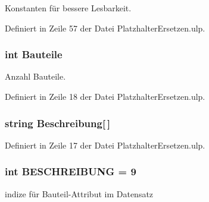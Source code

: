 Konstanten für bessere Lesbarkeit. 



Definiert in Zeile 57 der Datei Platzhalter\+Ersetzen.\+ulp.

\hypertarget{_platzhalter_ersetzen_8ulp_a82a1393e9fe80f33f56eeeb9b8d2195c}{}
\subsubsection[{Bauteile}]{\setlength{\rightskip}{0pt plus 5cm}int Bauteile}\label{_platzhalter_ersetzen_8ulp_a82a1393e9fe80f33f56eeeb9b8d2195c}


Anzahl Bauteile. 



Definiert in Zeile 18 der Datei Platzhalter\+Ersetzen.\+ulp.

\hypertarget{_platzhalter_ersetzen_8ulp_a0165df64e95135bade509c58bdb353f1}{}
\subsubsection[{Beschreibung}]{\setlength{\rightskip}{0pt plus 5cm}string Beschreibung\mbox{[}$\,$\mbox{]}}\label{_platzhalter_ersetzen_8ulp_a0165df64e95135bade509c58bdb353f1}


Definiert in Zeile 17 der Datei Platzhalter\+Ersetzen.\+ulp.

\hypertarget{_platzhalter_ersetzen_8ulp_ae410fcb7dc0f5e163526a9c617a825de}{}
\subsubsection[{B\+E\+S\+C\+H\+R\+E\+I\+B\+U\+N\+G}]{\setlength{\rightskip}{0pt plus 5cm}int B\+E\+S\+C\+H\+R\+E\+I\+B\+U\+N\+G = 9}\label{_platzhalter_ersetzen_8ulp_ae410fcb7dc0f5e163526a9c617a825de}


indize für Bauteil-\/\+Attribut im Datensatz 



